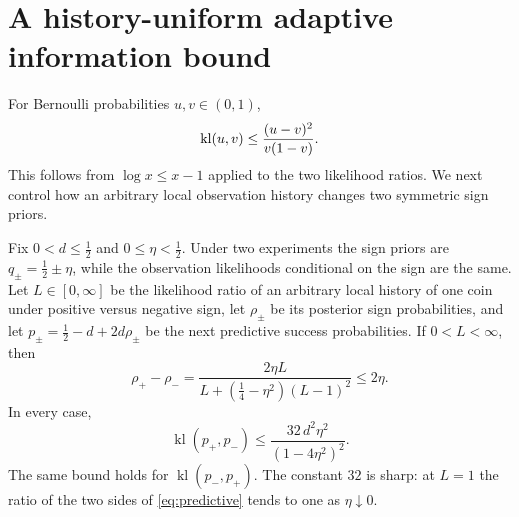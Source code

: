 \section{A history-uniform adaptive information bound}\label{sec:lower}
For Bernoulli probabilities $u,v\in(0,1)$,
\begin{equation}\label{eq:ber-kl}
 \operatorname{kl}(u,v)\le\frac{(u-v)^2}{v(1-v)}.
\end{equation}
This follows from $\log x\le x-1$ applied to the two likelihood ratios.
We next control how an arbitrary local observation history changes two
symmetric sign priors.

\begin{lemma}\label{lem:posterior}
Fix $0<d\le\tfrac12$ and $0\le\eta<\tfrac12$. Under two experiments the sign priors are
$q_\pm=\tfrac12\pm\eta$, while the observation likelihoods conditional on the sign are the
same. Let $L\in[0,\infty]$ be the likelihood ratio of an arbitrary local history of one
coin under positive versus negative sign, let $\rho_\pm$ be its posterior sign
probabilities, and let $p_\pm=\tfrac12-d+2d\rho_\pm$ be the next predictive success
probabilities. If $0<L<\infty$, then
\begin{equation}\label{eq:posterior}
\rho_+-\rho_-=\frac{2\eta L}{L+(\tfrac14-\eta^2)(L-1)^2}\le2\eta .
\end{equation}
In every case,
\begin{equation}\label{eq:predictive}
\operatorname{kl}(p_+,p_-)\le\frac{32\,d^2\eta^2}{(1-4\eta^2)^2}.
\end{equation}
The same bound holds for $\operatorname{kl}(p_-,p_+)$. The constant $32$ is sharp: at $L=1$ the ratio of the two sides of
\eqref{eq:predictive} tends to one as $\eta\downarrow0$.
\end{lemma}

